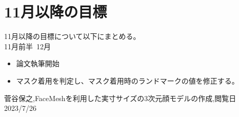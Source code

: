 \documentclass[]{jarticle}          %
\begin{document}
\section{11月以降の目標}
11月以降の目標について以下にまとめる。\\
11月前半~12月
\begin{itemize}
  \item 論文執筆開始
  \item マスク着用を判定し、マスク着用時のランドマークの値を修正する。
\end{itemize}
\begin{thebibliography}{99}
 菅谷保之,FaceMeshを利用した実寸サイズの3次元顔モデルの作成,閲覧日2023/7/26
\end{thebibliography}
\end{document}
